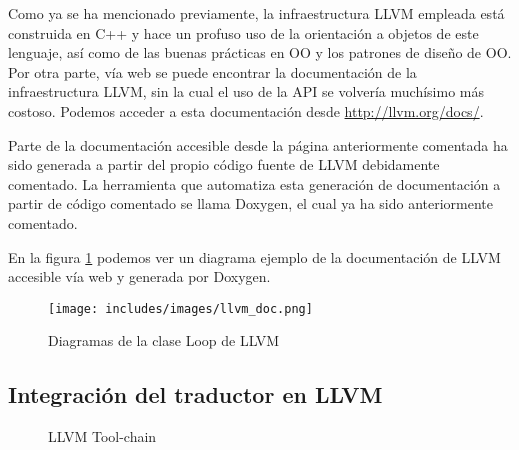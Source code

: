 Como ya se ha mencionado previamente, la infraestructura LLVM empleada está construida en C++ y hace un profuso uso de la orientación a objetos de este lenguaje, así como de las buenas prácticas en OO y los patrones de diseño de OO. Por otra parte, vía web se puede encontrar la documentación de la infraestructura LLVM, sin la cual el uso de la API se volvería muchísimo más costoso. Podemos acceder a esta documentación desde \href{http://llvm.org/docs/}{http://llvm.org/docs/}.

Parte de la documentación accesible desde la página anteriormente comentada ha sido generada a partir del propio código fuente de LLVM debidamente comentado. La herramienta que automatiza esta generación de documentación a partir de código comentado se llama Doxygen, el cual ya ha sido anteriormente comentado.

En la figura \ref{fig:LoopLLVM} podemos ver un diagrama ejemplo de la documentación de LLVM accesible vía web y generada por Doxygen.

\begin{figure}[tph]
\centering
\texttt{[image: includes/images/llvm\_doc.png]}
\caption{Diagramas de la clase Loop de LLVM}
\label{fig:LoopLLVM}
\end{figure}

\subsection{Integración del traductor en LLVM}
%
\begin{figure}[tph]
\begin{center}
\caption{LLVM Tool-chain}
\label{fig:intro:llvm_toolchain}
\end{center}
\end{figure}
%

